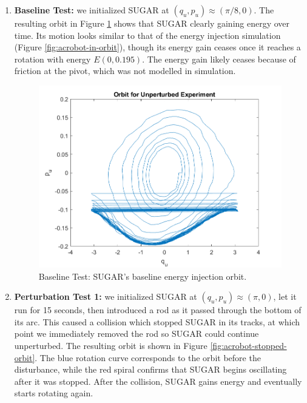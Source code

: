 \documentclass[journal,twoside,web, onecolumn, draftcls]{ieeecolor}
\begin{document}
\begin{enumerate}
    \item \textbf{Baseline Test:} 
    we initialized SUGAR at 
    \((q_u,p_u) \approx \left(\pi/8,0\right)\). 
    The resulting orbit in Figure \ref{fig:acrobot-unperturbed-orbit} shows
    that SUGAR clearly gaining energy over time.
    Its motion looks similar to that of the energy injection simulation (Figure
    \ref{fig:acrobot-in-orbit}), though its energy gain ceases once it reaches a
    rotation with energy \(E(0,0.195)\).
    The energy gain likely ceases because of friction at the pivot, which was
    not modelled in simulation.

\begin{figure}
    \centering
    \includegraphics[width=0.8\linewidth]{acrobot_unperturbed_orbit.png}
    \caption{Baseline Test: SUGAR's baseline energy injection orbit.}
    \label{fig:acrobot-unperturbed-orbit}
\end{figure}

\item \textbf{Perturbation Test 1:}
    we initialized SUGAR at 
    \((q_u,p_u) \approx \left(\pi,0\right)\), let it run for 15
    seconds, then introduced a rod as it passed through the bottom of
    its arc.
    This caused a collision which stopped SUGAR in its tracks, at which
    point we immediately removed the rod so SUGAR could continue
    unperturbed.
    The resulting orbit is shown in Figure \ref{fig:acrobot-stopped-orbit}.
    The blue rotation curve corresponds to the orbit before the disturbance,
    while the red spiral confirms that SUGAR begins oscillating after it
    was stopped.  
    After the collision, SUGAR gains energy and eventually starts
    rotating again.


\end{enumerate}
\end{document}

